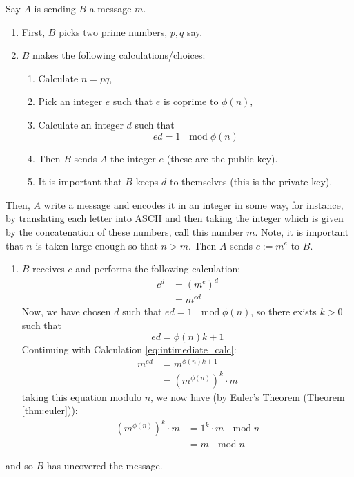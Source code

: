\documentclass[12pt]{article}
\theoremstyle{plain}
\theoremstyle{definition}
\begin{document}
Say $A$ is sending $B$ a message $m$.
\begin{enumerate}
\item First, $B$ picks two prime numbers, $p,q$ say.
\item $B$ makes the following calculations/choices:
\begin{enumerate}
\item Calculate $n = pq$,
\item Pick an integer $e$ such that $e$ is coprime to $\phi(n)$,
\item Calculate an integer $d$ such that
\begin{equation}
ed = 1\text{ }\operatorname{mod}\phi(n)
\end{equation}
\item Then $B$ sends $A$ the integer $e$ (these are the public key).
\item It is important that $B$ keeps $d$ to themselves (this is the private key).
\end{enumerate}
\end{enumerate}
Then, $A$ write a message and encodes it in an integer in some way, for instance, by translating each letter into ASCII and then taking the integer which is given by the concatenation of these numbers, call this number $m$. Note, it is important that $n$ is taken large enough so that $n > m$. Then $A$ sends $c := m^e$ to $B$.
\begin{enumerate}
\item $B$ receives $c$ and performs the following calculation:
\begin{align}
c^d &= (m^e)^d\\
&= m^{ed}\label{eq:intimediate_calc}
\end{align}
Now, we have chosen $d$ such that $ed = 1\text{ }\operatorname{mod}\phi(n)$, so there exists $k > 0$ such that
\begin{equation}
ed = \phi(n)k + 1
\end{equation}
Continuing with Calculation \eqref{eq:intimediate_calc}:
\begin{align}
m^{ed} &= m^{\phi(n)k + 1}\\
&= (m^{\phi(n)})^k\cdot m
\end{align}
taking this equation modulo $n$, we now have (by Euler's Theorem (Theorem \ref{thm:euler})):
\begin{align}
(m^{\phi(n)})^k\cdot m &= 1^k\cdot m\text{ }\operatorname{mod}n\\
&= m\text{ }\operatorname{mod}n\
\end{align}
\end{enumerate}
and so $B$ has uncovered the message.
\end{document}
